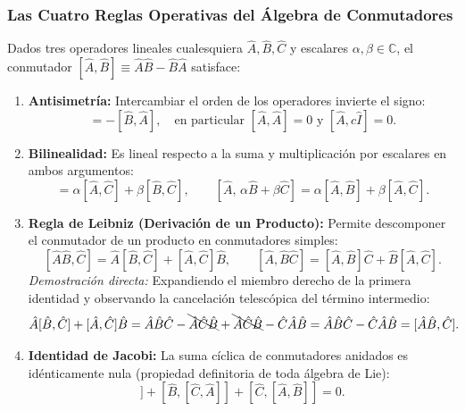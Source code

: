 \subsubsection{Las Cuatro Reglas Operativas del Álgebra de Conmutadores}

Dados tres operadores lineales cualesquiera $\hat{A}, \hat{B}, \hat{C}$ y escalares $\alpha, \beta \in \mathbb{C}$, el conmutador $[\hat{A}, \hat{B}] \equiv \hat{A}\hat{B} - \hat{B}\hat{A}$ satisface:
\begin{enumerate}
    \item \textbf{Antisimetría:} Intercambiar el orden de los operadores invierte el signo:
    \begin{equation}
        [\hat{A}, \hat{B}] = -[\hat{B}, \hat{A}], \quad \text{en particular } [\hat{A}, \hat{A}] = 0 \text{ y } [\hat{A}, c\hat{I}] = 0.
    \end{equation}
    \item \textbf{Bilinealidad:} Es lineal respecto a la suma y multiplicación por escalares en ambos argumentos:
    \begin{equation}
        [\alpha\hat{A} + \beta\hat{B}, \, \hat{C}] = \alpha[\hat{A}, \hat{C}] + \beta[\hat{B}, \hat{C}], \qquad [\hat{A}, \, \alpha\hat{B} + \beta\hat{C}] = \alpha[\hat{A}, \hat{B}] + \beta[\hat{A}, \hat{C}].
    \end{equation}
    \item \textbf{Regla de Leibniz (Derivación de un Producto):} Permite descomponer el conmutador de un producto en conmutadores simples:
    \begin{equation}
        \boxed{[\hat{A}\hat{B}, \hat{C}] = \hat{A}[\hat{B}, \hat{C}] + [\hat{A}, \hat{C}]\hat{B}}, \qquad
        \boxed{[\hat{A}, \hat{B}\hat{C}] = [\hat{A}, \hat{B}]\hat{C} + \hat{B}[\hat{A}, \hat{C}]}.
        \label{eq:leibniz_comm_basic}
    \end{equation}
    \textit{Demostración directa:} Expandiendo el miembro derecho de la primera identidad y observando la cancelación telescópica del término intermedio:
    \begin{equation}
        \hat{A}[\hat{B}, \hat{C}] + [\hat{A}, \hat{C}]\hat{B} = \hat{A}\hat{B}\hat{C} - \bcancel{\hat{A}\hat{C}\hat{B}} + \bcancel{\hat{A}\hat{C}\hat{B}} - \hat{C}\hat{A}\hat{B} = \hat{A}\hat{B}\hat{C} - \hat{C}\hat{A}\hat{B} = [\hat{A}\hat{B}, \hat{C}].
    \end{equation}
    \item \textbf{Identidad de Jacobi:} La suma cíclica de conmutadores anidados es idénticamente nula (propiedad definitoria de toda álgebra de Lie):
    \begin{equation}
        [\hat{A}, [\hat{B}, \hat{C}]] + [\hat{B}, [\hat{C}, \hat{A}]] + [\hat{C}, [\hat{A}, \hat{B}]] = 0.
    \end{equation}
\end{enumerate}

